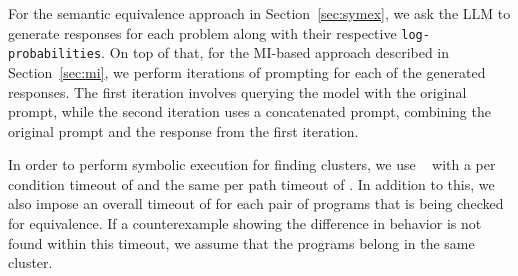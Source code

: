 For the semantic equivalence approach in Section~\ref{sec:symex}, we ask the LLM to generate \numSamples responses for each problem along with their respective \texttt{log-probabilities}.
On top of that, for the MI-based approach described in Section~\ref{sec:mi}, we perform \numIterations iterations of prompting for each of the \numSamples generated responses. The first iteration involves querying the model with the original prompt, while the second iteration uses a concatenated prompt, combining the original prompt and the response from the first iteration. 

In order to perform symbolic execution for finding clusters, we use \crosshair~\cite{crosshair} with a per condition timeout of \CrosshairPerConditiontimeout and the same per path timeout of \CrosshairPerPathtimeout. 
In addition to this, we also impose an overall timeout of \Crosshairtotaltimeout for each pair of programs that is being checked for equivalence.
If a counterexample showing the difference in behavior is not found within this timeout, we assume that the programs belong in the same cluster. 


